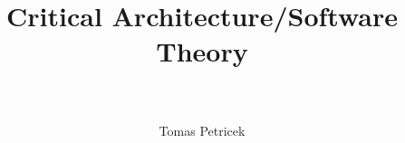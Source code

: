 \documentclass[fleqn,11pt]{report}
\begin{document}
\title{\Huge \textbf{Critical Architecture/Software Theory}\\~\\}
\author{Tomas Petricek}
\maketitle





\end{document}
